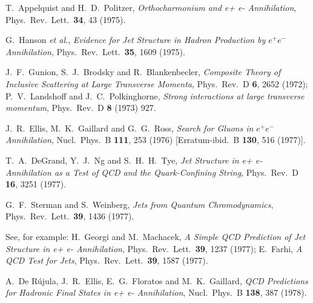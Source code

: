 \documentclass[12pt]{article} %
\begin{document}
\begin{thebibliography}{9}
T.~Appelquist and H.~D.~Politzer,
{\it Orthocharmonium and e+ e- Annihilation},
  Phys.\ Rev.\ Lett.\  {\bf 34}, 43 (1975).

G.~Hanson {\it et al.},
{\it Evidence for Jet Structure in Hadron Production by $e^+ e^-$ Annihilation},
  Phys.\ Rev.\ Lett.\  {\bf 35}, 1609 (1975).

J.~F.~Gunion, S.~J.~Brodsky and R.~Blankenbecler,
{\it Composite Theory of Inclusive Scattering at Large Transverse Momenta},
  Phys.\ Rev.\ D {\bf 6}, 2652 (1972);
P.~V.~Landshoff and J.~C.~Polkinghorne,
{\it Strong interactions at large transverse momentum},
  Phys.\ Rev.\ D {\bf 8} (1973) 927.
  
J.~R.~Ellis, M.~K.~Gaillard and G.~G.~Ross,
{\it Search for Gluons in $e^+ e^-$ Annihilation},
  Nucl.\ Phys.\ B {\bf 111}, 253 (1976)
  [Erratum-ibid.\ B {\bf 130}, 516 (1977)].

T.~A.~DeGrand, Y.~J.~Ng and S.~H.~H.~Tye,
{\it Jet Structure in e+ e- Annihilation as a Test of QCD and the Quark-Confining String},
  Phys.\ Rev.\ D {\bf 16}, 3251 (1977).

G.~F.~Sterman and S.~Weinberg,
{\it Jets from Quantum Chromodynamics},
  Phys.\ Rev.\ Lett.\  {\bf 39}, 1436 (1977).

See, for example:
H.~Georgi and M.~Machacek,
{\it A Simple QCD Prediction of Jet Structure in e+ e- Annihilation},
  Phys.\ Rev.\ Lett.\  {\bf 39}, 1237 (1977);
E.~Farhi,
{\it A QCD Test for Jets},
  Phys.\ Rev.\ Lett.\  {\bf 39}, 1587 (1977).
  
A.~De R{\' u}jula, J.~R.~Ellis, E.~G.~Floratos and M.~K.~Gaillard,
{\it QCD Predictions for Hadronic Final States in e+ e- Annihilation},
  Nucl.\ Phys.\ B {\bf 138}, 387 (1978).


\end{thebibliography}
\end{document}
